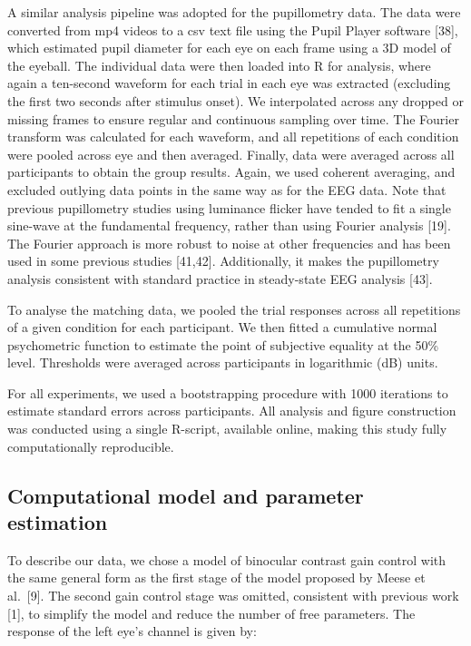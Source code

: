 \documentclass[
]{article}
\begin{document}
A similar analysis pipeline was adopted for the pupillometry data. The data were converted from mp4 videos to a csv text file using the Pupil Player software {[}38{]}, which estimated pupil diameter for each eye on each frame using a 3D model of the eyeball. The individual data were then loaded into R for analysis, where again a ten-second waveform for each trial in each eye was extracted (excluding the first two seconds after stimulus onset). We interpolated across any dropped or missing frames to ensure regular and continuous sampling over time. The Fourier transform was calculated for each waveform, and all repetitions of each condition were pooled across eye and then averaged. Finally, data were averaged across all participants to obtain the group results. Again, we used coherent averaging, and excluded outlying data points in the same way as for the EEG data. Note that previous pupillometry studies using luminance flicker have tended to fit a single sine-wave at the fundamental frequency, rather than using Fourier analysis {[}19{]}. The Fourier approach is more robust to noise at other frequencies and has been used in some previous studies {[}41,42{]}. Additionally, it makes the pupillometry analysis consistent with standard practice in steady-state EEG analysis {[}43{]}.

To analyse the matching data, we pooled the trial responses across all repetitions of a given condition for each participant. We then fitted a cumulative normal psychometric function to estimate the point of subjective equality at the 50\% level. Thresholds were averaged across participants in logarithmic (dB) units.

For all experiments, we used a bootstrapping procedure with 1000 iterations to estimate standard errors across participants. All analysis and figure construction was conducted using a single R-script, available online, making this study fully computationally reproducible.

\hypertarget{computational-model-and-parameter-estimation}{%
\subsection{Computational model and parameter estimation}\label{computational-model-and-parameter-estimation}}

To describe our data, we chose a model of binocular contrast gain control with the same general form as the first stage of the model proposed by Meese et al.~{[}9{]}. The second gain control stage was omitted, consistent with previous work {[}1{]}, to simplify the model and reduce the number of free parameters. The response of the left eye's channel is given by:
\end{document}
